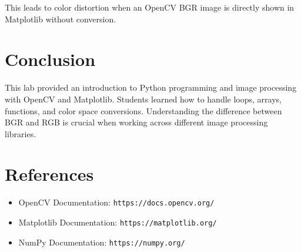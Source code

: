 \documentclass[12pt]{article}
\begin{document}
This leads to color distortion when an OpenCV BGR image is directly shown in Matplotlib without conversion.

\section*{Conclusion}
This lab provided an introduction to Python programming and image processing with OpenCV and Matplotlib. Students learned how to handle loops, arrays, functions, and color space conversions. Understanding the difference between BGR and RGB is crucial when working across different image processing libraries.

\section*{References}
\begin{itemize}
    \item OpenCV Documentation: \texttt{https://docs.opencv.org/}
    \item Matplotlib Documentation: \texttt{https://matplotlib.org/}
    \item NumPy Documentation: \texttt{https://numpy.org/}
\end{itemize}
\end{document}
